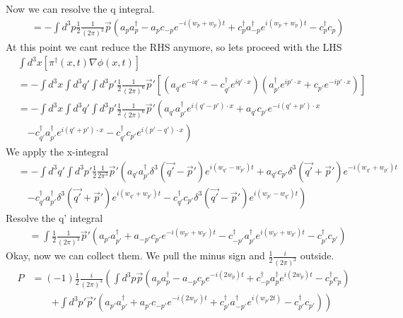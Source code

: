 \documentclass[working, oneside]{../../Preambles/tuftebook}
\begin{document}
\begin{solution}
Now we can resolve the q integral.
\begin{align*}
&= - \int d^3p \frac{1}{2} \frac{1}{(2\pi)^3} \vec{p} \left( a_p a_p^\dagger - a_p c_{-p} e^{-i(w_p + w_p)t} + c_p^\dagger a_{-p}^\dagger e^{i(w_p + w_p)t} - c_p^\dagger c_p \right)
\end{align*}
At this point we cant reduce the RHS anymore, so lets proceed with the LHS
\begin{align*}
&\int d^3x \left[ \pi^\dagger(x,t) \nabla \phi(x,t) \right] \\
&= - \int d^3x \int d^3q' \int d^3p' \frac{1}{2} \frac{1}{(2\pi)^6} \vec{p}' \left[ \left( a_{q'} e^{-i q' \cdot x} - c_{q'}^\dagger e^{i q' \cdot x} \right) \left( a_{p'}^\dagger e^{i p' \cdot x} + c_{p'} e^{-i p' \cdot x} \right) \right] \\
&= - \int d^3x \int d^3q' \int d^3p' \frac{1}{2} \frac{1}{(2\pi)^6} \vec{p}' \left( a_{q'} a_{p'}^\dagger e^{i(q'-p') \cdot x} + a_{q'} c_{p'} e^{-i(q'+p') \cdot x} \right. \\
&\quad \left. - c_{q'}^\dagger a_{p'}^\dagger e^{i(q'+p') \cdot x} - c_{q'}^\dagger c_{p'} e^{i(p'-q') \cdot x} \right)
\end{align*}
We apply the x-integral
\begin{align*}
&= - \int d^3q' \int d^3p' \frac{1}{2}\frac{1}{2\pi^{3}} \vec{p}' \left( a_{q'} a_{p'}^\dagger \delta^3(\vec{q'} - \vec{p}') e^{i(w_{q'} - w_{p'})t} + a_{q'} c_{p'} \delta^3(\vec{q'} + \vec{p}') e^{-i(w_{q'} + w_{p'})t} \right. \\
&\quad \left. - c_{q'}^\dagger a_{p'}^\dagger \delta^3(\vec{q'} + \vec{p}') e^{i(w_{q'} + w_{p'})t} - c_{q'}^\dagger c_{p'} \delta^3(\vec{q'} - \vec{p}') e^{i(w_{p'} - w_{q'})t} \right)
\end{align*}
Resolve the q' integral
\begin{align*}
&= \int \frac{1}{2} \frac{1}{(2\pi)^3} \vec{p}' \left( a_{p'} a_{p'}^\dagger + a_{-p'} c_{p'} e^{-i(w_{p'} + w_{p'})t} - c_{-p'}^\dagger a_{p'}^\dagger e^{i(w_{p'} + w_{p'})t} - c_{p'}^\dagger c_{p'} \right)
\end{align*}
Okay, now we can collect them. We pull the minus sign and $\frac{1}{2} \frac{i}{(2\pi)^3}$ outside.
\begin{align*}
P &= (-1) \frac{1}{2} \frac{i}{(2\pi)^3} \left( \int d^3p \vec{p} (a_p a_p^\dagger - a_{-p} c_p e^{-i(2w_p)t} + c_{-p}^\dagger a_p^\dagger e^{i(2w_p)t} - c_p^\dagger c_p) \right. \\
&\qquad \left. + \int d^3p' \vec{p}' (a_{p'} a_{p'}^\dagger + a_{p'} c_{-p'} e^{-i(2w_{p'})t} + c_{p'}^\dagger a_{-p'}^\dagger e^{i(w_{p'}2t)} - c_{p'}^\dagger c_{p'}) \right)

\end{align*}
\end{solution}
\end{document}
